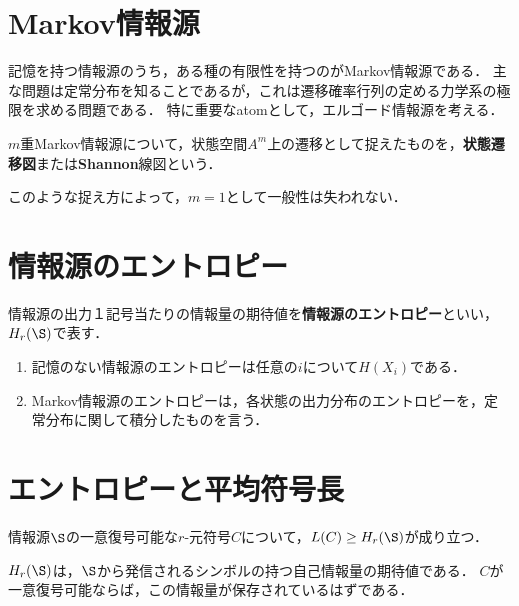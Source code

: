 \documentclass[uplatex,dvipdfmx]{jsreport}
\begin{document}
\section{Markov情報源}

\begin{tcolorbox}[colframe=ForestGreen, colback=ForestGreen!10!white,breakable,colbacktitle=ForestGreen!40!white,coltitle=black,fonttitle=\bfseries\sffamily,
title=]
    記憶を持つ情報源のうち，ある種の有限性を持つのがMarkov情報源である．
    主な問題は定常分布を知ることであるが，これは遷移確率行列の定める力学系の極限を求める問題である．
    特に重要なatomとして，エルゴード情報源を考える．
\end{tcolorbox}

\begin{definition}
    $m$重Markov情報源について，状態空間$A^m$上の遷移として捉えたものを，\textbf{状態遷移図}または\textbf{Shannon}線図という．
\end{definition}
\begin{remarks}
    このような捉え方によって，$m=1$として一般性は失われない．
\end{remarks}

\section{情報源のエントロピー}

\begin{definition}
    情報源の出力１記号当たりの情報量の期待値を\textbf{情報源のエントロピー}といい，$H_r(\S)$で表す．
\end{definition}
\begin{example}\mbox{}
    \begin{enumerate}
        \item 記憶のない情報源のエントロピーは任意の$i$について$H(X_i)$である．
        \item Markov情報源のエントロピーは，各状態の出力分布のエントロピーを，定常分布に関して積分したものを言う．
    \end{enumerate}
\end{example}

\section{エントロピーと平均符号長}

\begin{theorem}
    情報源$\S$の一意復号可能な$r$-元符号$C$について，$L(C)\ge H_r(\S)$が成り立つ．
\end{theorem}
\begin{remarks}
    $H_r(\S)$は，$\S$から発信されるシンボルの持つ自己情報量の期待値である．
    $C$が一意復号可能ならば，この情報量が保存されているはずである．
\end{remarks}
\end{document}
